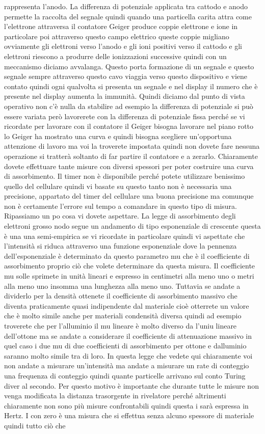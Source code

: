 {rappresenta l'anodo. La differenza di potenziale applicata tra cattodo e anodo permette la raccolta del segnale quindi quando una particella carita attra come l'elettrone attraversa il contatore Geiger produce coppie elettrone e ione in particolare poi attraverso questo campo elettrico queste coppie migliano ovviamente gli elettroni verso l'anodo e gli ioni positivi verso il cattodo e gli elettroni riescono a produrre delle ionizzazioni successive quindi con un meccanismo diciamo avvalanga. Questo porta formazione di un segnale e questo segnale sempre attraverso questo cavo viaggia verso questo dispositivo e viene contato quindi ogni qualvolta si presenta un segnale e nel display il numero che è presente nel display aumenta la immunità. Quindi diciamo dal punto di vista operativo non c'è nulla da stabilire ad esempio la differenza di potenziale si può essere variata però lavorerete con la differenza di potenziale fissa perché se vi ricordate per lavorare con il contatore il Geiger bisogna lavorare nel piano rotto lo Geiger ha mostrato una curva e quindi bisogna scegliere un'opportuna attenzione di lavoro ma voi la troverete impostata quindi non dovete fare nessuna operazione si tratterà soltanto di far partire il contatore e a zerarlo. Chiaramente dovete effettuare tante misure con diversi spessori per poter costruire una curva di assorbimento. Il timer non è disponibile perché potete utilizzare benissimo quello del cellulare quindi vi basate su questo tanto non è necessaria una precisione, appartato del timer del cellulare una buona precisione ma comunque non è certamente l'errore sul tempo a comandare in questo tipo di misura. Ripassiamo un po cosa vi dovete aspettare. La legge di assorbimento degli elettroni grosso nodo segue un andamento di tipo esponenziale di crescente questa è una una semi-empirica se vi ricordate in particolare quindi vi aspettate che l'intensità si riduca attraverso una funzione esponenziale dove la pennenza dell'esponenziale è determinato da questo parametro mu che è il coefficiente di assorbimento proprio ciò che volete determinare da questa misura. Il coefficiente mu solle sprimete in unità lineari e espresso in centimetri alla meno uno o metri alla meno uno insomma una lunghezza alla meno uno. Tuttavia se andate a dividerlo per la densità ottenete il coefficiente di assorbimento massivo che diventa praticamente quasi indipendente dal materiale cioè otterrete un valore che è molto simile anche per materiali condensità diversa quindi ad esempio troverete che per l'alluminio il mu lineare è molto diverso da l'uniu lineare dell'ottone ma se andate a considerare il coefficiente di attenuazione massivo in quel caso i due mu di due coefficienti di assorbimento per ottone e dalluminio saranno molto simile tra di loro. In questa legge che vedete qui chiaramente voi non andate a misurare un'intensità ma andate a misurare un rate di conteggio una frequenza di conteggio quindi quante particelle arrivano sul conto Turing diver al secondo. Per questo motivo è importante che durante tutte le misure non venga modificata la distanza trasorgente in rivelatore perché altrimenti chiaramente non sono più misure confrontabili quindi questa i sarà espressa in Hertz. I con zero è una misura che si effettua senza alcuno spessore di materiale quindi tutto ciò che }
